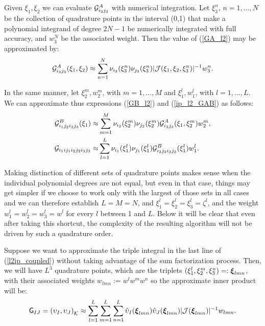 Given $\xi_1,\xi_2$ we can evaluate $\mathcal{G}_{i_3j_3}^A$ with numerical integration. Let $\xi_3^n$, $n=1,...,N$ be the collection of quadrature points in the interval (0,1) that make a polynomial integrand of degree $2N-1$ be numerically integrated with full accuracy, and $w_3^N$ be the associated weight. Then the value of (\ref{GA_l2}) may be approximated by:
% 
\begin{equation}
    \mathcal{G}_{i_3j_3}^A(\xi_1,\xi_2)\approx \sum\limits_{n=1}^N\nu_{i_3}(\xi_3^n)\nu_{j_3}(\xi_3^n)|\mathcal{J}(\xi_1,\xi_2,\xi_3^n)|^{-1}w_3^n.
    \label{GA_l2_quad}
\end{equation}

In the same manner, let $\xi_2^m,w_2^m$, with $m=1,...,M$ and $\xi^l_1,w_1^l$, with $l=1,...,L$. We can approximate thus expressions (\ref{GB_l2}) and (\ref{ip_l2_GAB}) as follows:
% 
\begin{align}
    \mathcal{G}_{i_1j_2i_3j_3}^B(\xi_1)\approx& \sum\limits_{m=1}^M\nu_{i_2}(\xi_2^m)\nu_{j_2}(\xi_2^m)\mathcal{G}_{i_3j_3}^A(\xi_1,\xi_2^m)w_2^m, \label{GB_l2_quad}\\
    \mathcal{G}_{i_1ij_1i_2j_2i_3j_3}\approx&
    \sum\limits_{l=1}^L\nu_{i_1}(\xi_1^l)\nu_{j_1}(\xi_1^l)\mathcal{G}_{i_2j_2i_3j_3}^B(\xi_1^l)w_1^l .\label{ip_l2tensor}    
\end{align}

Making distinction of different sets of quadrature points makes sense when the individual polynomial degrees are not equal, but even in that case, things may get simpler if we choose to work only with the largest of those sets in all cases and we can therefore establish $L=M=N$, and $\xi_1^l=\xi_2^l=\xi_3^l=\zeta^l$, and the weight $w_1^l=w_2^l=w_3^l=w^l$ for every $l$ between 1 and $L$. Below it will be clear that even after taking this shortcut, the complexity of the resulting algorithm will not be driven by such a quadrature order.

Suppose we want to approximate the triple integral in the last line of (\ref{l2ip_coupled}) without taking advantage of the sum factorization process. Then, we will have $L^3$ quadrature points, which are the triplets $(\xi_1^l,\xi_2^m,\xi_3^n)=:\boldsymbol{\xi}_{lmn}$, with their associated weights $w_{lmn}:=w^lw^mw^n$ so the approximate inner product will be:
% 
\begin{equation}
    \mathsf{G}_{IJ}=\left(\upsilon_I,\upsilon_J\right)_{\mathcal{K}}\approx \sum\limits_{l=1}^L\sum\limits_{m=1}^L\sum\limits_{n=1}^L \hat{\upsilon}_I(\boldsymbol{\xi}_{lmn})\hat{\upsilon}_J(\boldsymbol{\xi}_{lmn})|\mathcal{J}(\boldsymbol{\xi}_{lmn})|^{-1}w_{lmn}.
    \label{ip_l2conven}
\end{equation}

